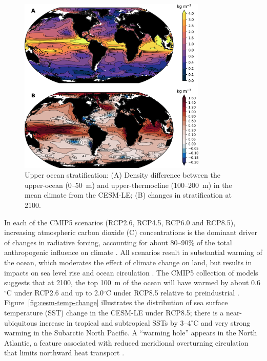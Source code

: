 \documentclass{report_chapter}
\begin{document}
\begin{figure}[tbp]
\centering
\includegraphics[width=0.8\textwidth]{cesm-stratification.png}
\caption{Upper ocean stratification: (A) Density difference between the upper-ocean (0--50~m) and upper-thermocline (100--200~m) in the mean climate from the CESM-LE; (B) changes in stratification at 2100.}
\label{fig:cesm-stratification}
\end{figure}

In each of the CMIP5 scenarios (RCP2.6, RCP4.5, RCP6.0 and RCP8.5), increasing atmospheric carbon dioxide (C\OO{}) concentrations is the dominant driver of changes in radiative forcing, accounting for about 80--90\% of the total anthropogenic influence on climate \citep{Collins-Knutti-etal-2013}.
All scenarios result in substantial warming of the ocean, which moderates the effect of climate change on land, but results in impacts on sea level rise and ocean circulation \citep{Gattuso-Magnan-etal-2015}.
The CMIP5 collection of models suggests that at 2100, the top 100~m of the ocean will have warmed by about 0.6$^\circ$C under RCP2.6 and up to 2.0$^\circ$C under RCP8.5 relative to preindustrial \citep{Collins-Knutti-etal-2013}.
Figure~\ref{fig:cesm-temp-change} illustrates the distribution of sea surface temperature (SST) change in the CESM-LE under RCP8.5; there is a near-ubiquitous increase in tropical and subtropical SSTs by 3--4$^\circ$C and very strong warming in the Subarctic North Pacific.
A ``warming hole'' appears in the North Atlantic, a feature associated with reduced meridional overturning circulation that limits northward heat transport \citep{Drijfhout-Oldenborgh-etal-2012}.
\end{document}
